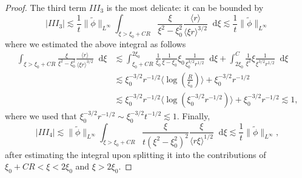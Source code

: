 \documentclass[11 pt]{amsart}
\theoremstyle{definition}
\theoremstyle{remark}
\numberwithin{equation}{section}
\newcommand{\dd}{\mathop{}\!\mathrm{d}}
\begin{document}
\begin{proof}
The third term $III_3$ is the most delicate: it can be bounded by
$$
|III_3| \lesssim \frac{1}{t} \|  \widetilde{\phi} \|_{L^\infty} \int_{\xi > \xi_0 + CR} \frac{\xi}{\xi^2 - \xi_0^2} \frac{\langle r \rangle}{\langle \xi r \rangle^{3/2}} \dd \xi \lesssim  \frac{1}{t} \| \widetilde{\phi} \|_{L^\infty}
$$
where we estimated the above integral as follows
\begin{align*}
\int_{\xi > \xi_0 + CR} \frac{\xi}{\xi^2 - \xi_0^2} \frac{\langle r \rangle}{\langle \xi r \rangle^{3/2}} \dd \xi 
& \lesssim \int_{\xi_0 + CR}^{2 \xi_0} \frac{1}{\xi_0} \frac{1}{\xi-\xi_0} \xi_0 \frac{1}{\xi_0^{3/2} r^{1/2}} \dd \xi  + \int_{2 \xi_0}^C \frac{1}{\xi^2} \xi \frac{1}{\xi^{3/2} r^{1/2}} \dd\xi \\
& \lesssim \xi_0^{-3/2} r^{-1/2} \langle \log(\frac R {\xi_0} ) \rangle + \xi_0^{-3/2} r^{-1/2} \\
& \lesssim \xi_0^{-3/2} r^{-1/2} \langle \log(\xi_0^{-3/2} r^{-1/2} ) \rangle + \xi_0^{-3/2} r^{-1/2} \lesssim 1,
\end{align*}
where we used that $\xi_0^{-3/2} r^{-1/2} \sim \xi_0^{-3/2} t^{-1/2} \lesssim 1$. Finally,
$$
|III_4| \lesssim \|  \widetilde{\phi} \|_{L^\infty} \int_{\xi > \xi_0 + CR} \frac{\xi}{t(\xi^2 - \xi_0^2)^2} \frac{\xi}{\langle r\xi \rangle^{1/2}} \dd \xi \lesssim \frac{1}{t} \|  \widetilde{\phi} \|_{L^\infty},
$$
after estimating the integral upon splitting it into the contributions of $\xi_0 + CR < \xi < 2 \xi_0$ and $\xi > 2\xi_0$.


\end{proof}
\end{document}
